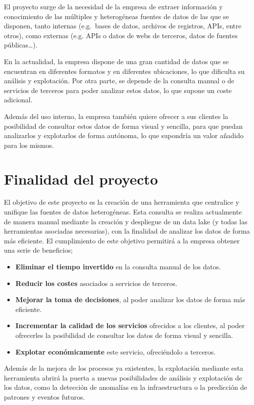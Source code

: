 El proyecto surge de la necesidad de la empresa de extraer información y conocimiento de las
múltiples y heterogéneas fuentes de datos de las que se disponen, tanto internas (e.g.~bases de
datos, archivos de registros, APIs, entre otros), como externas (e.g. APIs o datos de webs de
terceros, datos de fuentes públicas\ldots).

En la actualidad, la empresa dispone de una gran cantidad de datos que se encuentran en
diferentes formatos y en diferentes ubicaciones, lo que dificulta su análisis y explotación.
Por otra parte, se depende de la consulta manual o de servicios de terceros para poder analizar
estos datos, lo que supone un coste adicional.

Además del uso interno, la empresa también quiere ofrecer a sus clientes la posibilidad de
consultar estos datos de forma visual y sencilla, para que puedan analizarlos y explotarlos de
forma autónoma, lo que supondría un valor añadido para los mismos.

\section{Finalidad del proyecto}\label{sec:finalidad}
El objetivo de este proyecto es la creación de una herramienta que centralice y unifique las
fuentes de datos heterogéneas. Esta consulta se realiza actualmente de manera manual mediante
la creación y despliegue de un data lake (y todas las herramientas asociadas necesarias), con
la finalidad de analizar los datos de forma más eficiente. El cumplimiento de este objetivo
permitirá a la empresa obtener una serie de beneficios;

\begin{itemize}
	\item \textbf{Eliminar el tiempo invertido} en la consulta manual de los datos.
	\item \textbf{Reducir los costes} asociados a servicios de terceros.
	\item \textbf{Mejorar la toma de decisiones}, al poder analizar los datos de forma más eficiente.
	\item \textbf{Incrementar la calidad de los servicios} ofrecidos a los clientes, al poder ofrecerles
	    la posibilidad de consultar los datos de forma visual y sencilla.
	\item \textbf{Explotar económicamente} este servicio, ofreciéndolo a terceros.
\end{itemize}

Además de la mejora de los procesos ya existentes, la explotación mediante esta herramienta
abrirá la puerta a nuevas posibilidades de análisis y explotación de los datos, como la detección
de anomalías en la infraestructura o la predicción de patrones y eventos futuros.

